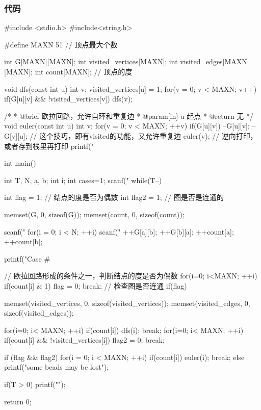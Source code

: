 \subsubsection{代码}
\begin{Codex}[label=eulerian_circuit.c]
#include <stdio.h>
#include<string.h>
 
#define MAXN 51  // 顶点最大个数
 
int G[MAXN][MAXN];
int visited_vertices[MAXN]; 
int visited_edges[MAXN][MAXN];
int count[MAXN]; // 顶点的度
 
void dfs(const int u) {  
    int v;
    visited_vertices[u] = 1;
    for(v = 0;  v < MAXN; v++) if(G[u][v] && !visited_vertices[v]) {
        dfs(v);
    }
}
 
/*
 * @brief 欧拉回路，允许自环和重复边
 * @param[in] u 起点
 * @return 无
 */
void euler(const int u){
    int v;
    for(v = 0; v < MAXN; ++v) if(G[u][v]){
        --G[u][v]; --G[v][u]; // 这个技巧，即有visited的功能，又允许重复边
        euler(v);
        // 逆向打印，或者存到栈里再打印
        printf("%
    }
}
 
int main() {
    int T, N, a, b;
    int i;
    int cases=1;
    scanf("%
    while(T--) {
        int flag = 1; // 结点的度是否为偶数
        int flag2 = 1; // 图是否是连通的
        
        memset(G, 0, sizeof(G));
        memset(count, 0, sizeof(count));
 
        scanf("%
        for(i = 0; i < N; ++i){
            scanf("%
            ++G[a][b];
            ++G[b][a];
            ++count[a];
            ++count[b];
        }
 
        printf("Case #%
 
        // 欧拉回路形成的条件之一，判断结点的度是否为偶数
        for(i=0; i<MAXN; ++i) {
            if(count[i] & 1){
                flag = 0;
                break;
            }
        }
        // 检查图是否连通
        if(flag) {
            memset(visited_vertices, 0, sizeof(visited_vertices));
            memset(visited_edges, 0, sizeof(visited_edges));
 
            for(i=0; i< MAXN; ++i) 
                if(count[i]) { 
                    dfs(i);
                    break; 
                }
            for(i=0; i< MAXN; ++i){
                if(count[i] && !visited_vertices[i]) {
                    flag2 = 0; 
                    break;
                }
            }
        }
        if (flag && flag2) {
            for(i = 0; i < MAXN; ++i) if(count[i]){
                euler(i);
                break;
            }
        } else {
            printf("some beads may be lost\n");
        }
 
        if(T > 0) printf("\n");
    }
    return 0;
}
\end{Codex}


